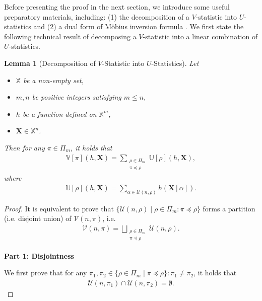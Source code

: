 \documentclass[12pt]{article}
\theoremstyle{plain}
\newtheorem{lemma}{Lemma}
\theoremstyle{definition}
\newcommand{\mobius}{M\"obius}
\newcommand{\sPi}{\pi}
\newcommand{\uset}{\calU}
\newcommand{\usetnm}[2]{\uset\left(#1,#2\right)}
\newcommand{\vset}{\calV}
\newcommand{\vsetp}[2]{\vset(#1,#2)}
\newcommand{\ustat}{\mathbb{U}}
\newcommand{\vstat}{\mathbb{V}}
\newcommand{\samplespace}{\bbX}
\newcommand{\partition}{\Pi}
\newcommand{\partitionp}[1]{\partition_{#1}}
\newcommand{\pleq}{\preceq}
\def\bbX{\mathbb{X}}
\def\calV{\mathcal{V}}
\def\calU{\mathcal{U}}
\begin{document}
\begin{bibunit}[agsm]
Before presenting the proof in the next section, we introduce some useful preparatory materials, including: (1) the decomposition of a $V$-statistic into $U$-statistics and (2) a dual form of \mobius{} inversion formula \citep{stanley2011enumerative}. We first state the following technical result of decomposing a $V$-statistic into a linear combination of $U$-statistics. 
\begin{lemma}[Decomposition of $V$-Statistic into $U$-Statistics]
\label{lem:decomp_v_to_u}
    Let
    \begin{itemize}
        \item $\samplespace$ be a non-empty set, 
        \item $m,n$ be positive integers satisfying $m \leq n$, 
        \item $h$ be a function defined on $\bbX^m$, 
        \item $\bm{X} \in \samplespace^n$. 
    \end{itemize}
    Then for any $\sPi \in \partitionp{m}$, it holds that
    \begin{align*}
        \vstat[\sPi](h, \bm{X}) = \sum_{\substack{
            \rho \in \partitionp{m} \\ \sPi \pleq \rho
        }} \ustat[\rho](h,\bm{X}),
    \end{align*}
    where
     \begin{align*}
       \ustat[\rho](h,\bm{X}) = \sum_{\alpha \in \usetnm{n}{\rho}} h(\bm{X}[\alpha]). 
    \end{align*}
\end{lemma}

\begin{proof}
It is equivalent to prove that $\{\usetnm{n}{\rho} \mid \rho \in \partitionp{m}: \sPi \pleq \rho\}$ forms a partition (i.e. disjoint union) of $\vsetp{n}{\sPi}$, i.e.
\begin{align*}
\vsetp{n}{\sPi} = \bigsqcup_{\substack{\rho \in \partitionp{m} \\ \sPi \pleq \rho} }\usetnm{n}{\rho}.
\end{align*}

    {\bf Part 1: Disjointness}
    
    We first prove that for any $\pi_1, \pi_2 \in \{\rho \in \partitionp{m} \mid \sPi \pleq \rho \}: \pi_1 \neq \pi_2$, it holds that
    \begin{align*}
        \usetnm{n}{\pi_1} \cap \usetnm{n}{\pi_2} = \emptyset. 
    \end{align*}


\end{proof}
\end{bibunit}
\end{document}

